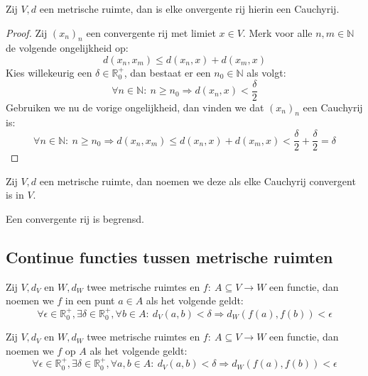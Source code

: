 \documentclass[main.tex]{subfiles}
\begin{document}
\begin{bst}
  Zij $V,d$ een metrische ruimte, dan is elke onvergente rij hierin een Cauchyrij.

  \begin{proof}
    Zij $(x_{n})_{n}$ een convergente rij met limiet $x\in V$.
    Merk voor alle $n,m\in \mathbb{N}$ de volgende ongelijkheid op:
    \[ d\left(x_{n},x_{m}\right) \le d(x_{n},x) + d(x_{m},x) \]
    Kies willekeurig een $\delta \in \mathbb{R}_{0}^{+}$, dan bestaat er een $n_{0}\in \mathbb{N}$ als volgt:
    \[ \forall n\in \mathbb{N}:\ n \ge n_{0} \Rightarrow d(x_{n},x) < \frac{\delta}{2}\]
    Gebruiken we nu de vorige ongelijkheid, dan vinden we dat $(x_{n})_{n}$ een Cauchyrij is:
    \[ \forall n\in \mathbb{N}:\ n \ge n_{0} \Rightarrow d\left(x_{n},x_{m}\right) \le d(x_{n},x) + d(x_{m},x) < \frac{\delta}{2} + \frac{\delta}{2} = \delta\]
  \end{proof}
\end{bst}

\begin{de}
  Zij $V,d$ een metrische ruimte, dan noemen we deze  als elke Cauchyrij convergent is in $V$.
\end{de}

\begin{st}
  Een convergente rij is begrensd.
\end{st}

\subsection{Continue functies tussen metrische ruimten}
\label{sec:cont-funct-tuss}

\begin{de}
  Zij $V,d_{V}$ en $W,d_{W}$ twee metrische ruimtes en $f:\ A \subseteq V \rightarrow W$ een functie, dan noemen we $f$  in een punt $a\in A$ als het volgende geldt:
  \[ \forall \epsilon \in \mathbb{R}_{0}^{+}, \exists \delta \in \mathbb{R}_{0}^{+}, \forall b \in A:\ d_{V}(a,b)< \delta \Rightarrow d_{W}(f(a),f(b)) < \epsilon \]
\end{de}

\begin{de}
  Zij $V,d_{V}$ en $W,d_{W}$ twee metrische ruimtes en $f:\ A \subseteq V \rightarrow W$ een functie, dan noemen we $f$  op $A$ als het volgende geldt:
  \[ \forall \epsilon \in \mathbb{R}_{0}^{+}, \exists \delta \in \mathbb{R}_{0}^{+}, \forall a,b \in A:\ d_{V}(a,b)< \delta \Rightarrow d_{W}(f(a),f(b)) < \epsilon \]
\end{de}
\end{document}
